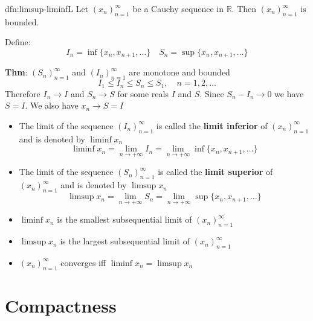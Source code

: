 \documentclass[landscape, 8pt]{extarticle}
\begin{document}
\begin{multicols}{3}
\begin{dfn}{dfn:limsup-liminf}{L}
    \vspace{-5pt}
    Let $(x_{n})^{\infty}_{n=1}$ be a Cauchy sequence in $\mathbb{R}$. Then $(x_{n})^{\infty}_{n=1}$ is bounded.

    Define:
    \[I_{n} = \inf \{x_{n}, x_{n+1},\dots\} \quad S_{n} = \sup \{x_{n}, x_{n+1},\dots\}\]

    \vspace{-5pt}
    \longrule{0.08ex}
    \textbf{Thm}: $(S_{n})^{\infty}_{n=1}$ and $(I_{n})^{\infty}_{n=1}$ are monotone and bounded
    \[I_{1} \le I_{n} \le S_{n} \le S_{1}, \quad n = 1,2,\dots\]
    Therefore $I_{n} \to I$ and $S_{n} \to S$ for some reals $I$ and $S$. Since $S_{n} - I_{n} \to 0$ we have $S = I$. We also have $x_{n}\to S = I$

    \vspace{-8pt}

    \begin{itemize}[leftmargin=*]
        \item The limit of the sequence $(I_{n})^{\infty}_{n=1}$ is called the \textbf{limit inferior} of $(x_{n})^{\infty}_{n=1}$ and is denoted by $\liminf x_{n}$
            \[\liminf x_{n} = \lim_{n\to +\infty} I_{n} = \lim_{n\to +\infty} \inf \{x_{n}, x_{n+1},\dots\}\]
        \item The limit of the sequence $(S_{n})^{\infty}_{n=1}$ is called the \textbf{limit superior} of $(x_{n})^{\infty}_{n=1}$ and is denoted by $\limsup x_{n}$
            \[\limsup x_{n} = \lim_{n\to +\infty} S_{n} = \lim_{n\to +\infty} \sup \{x_{n}, x_{n+1},\dots\}\]
    \end{itemize}

    \longrule{0.08ex}
    \vspace{-14pt}
    \begin{itemize}[leftmargin=*]
        \item $\liminf x_{n}$ is the smallest subsequential limit of $(x_{n})^{\infty}_{n=1}$
        \item $\limsup x_{n}$ is the largest subsequential limit of $(x_{n})^{\infty}_{n=1}$
        \item $(x_{n})^{\infty}_{n=1}$ converges iff $\liminf x_{n} = \limsup x_{n}$
    \end{itemize}
\end{dfn}

\vspace{-16pt}
\section{Compactness}


\end{multicols}
\end{document}
